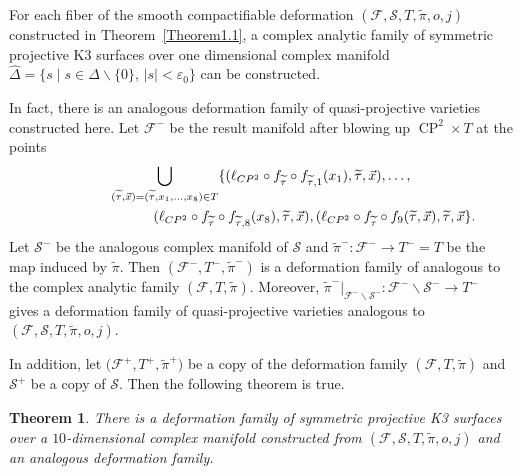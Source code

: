 \documentclass[pdftex]{sigma}
\numberwithin{equation}{section}
\newtheorem{Theorem}{Theorem}[section]
\begin{document}
For each fiber of the smooth compactifiable deformation $(\mathcal{F},\mathcal{S},T,\widetilde{\pi},o,j)$ constructed in Theorem~\ref{Theorem1.1}, a complex analytic family of symmetric projective K3 surfaces over one dimensional complex manifold $\hat{\Delta}=\{ s\mid s \in \Delta \backslash \{ 0 \},\, |s|<\varepsilon_0 \}$ can be constructed.

In fact, there is an analogous deformation family of quasi-projective varieties constructed here. Let $\mathcal{F}^-$ be the result manifold after blowing up $\operatorname{CP}^2\times T$ at the points
\begin{gather*}
\bigcup_{(\widetilde{\tau},\vec{x})=(\widetilde{\tau},x_1,\dots ,x_8)\in T}\{(\ell_{CP^2}\circ f_{\widetilde{\tau}}\circ f_{\widetilde{\tau},1}(x_1),\widetilde{\tau},\vec{x}),\dots ,\\
\hphantom{\bigcup_{(\widetilde{\tau},\vec{x})=(\widetilde{\tau},x_1,\dots ,x_8)\in T}} (\ell_{CP^2}\circ f_{\widetilde{\tau}}\circ f_{\widetilde{\tau},8}(x_8),\widetilde{\tau},\vec{x}),(\ell_{CP^2}\circ f_{\widetilde{\tau}}\circ f_9(\widetilde{\tau},\vec{x}),\widetilde{\tau},\vec{x}\}.
\end{gather*}
Let $\mathcal{S}^-$ be the analogous complex manifold of $\mathcal{S}$ and $\widetilde{\pi}^-\colon\mathcal{F}^- \rightarrow T^-=T$ be the map induced by $\widetilde{\pi}$. Then $(\mathcal{F}^-, T^-, \widetilde{\pi}^-)$ is a deformation family of  analogous to the complex analytic family $(\mathcal{F}, T, \widetilde{\pi})$. Moreover, $\widetilde{\pi}^-|_{\mathcal{F}^-\backslash \mathcal{S}^-}\colon{\mathcal{F}^-\backslash \mathcal{S}^-} \rightarrow T^-$ gives a deformation family of quasi-projective varieties analogous to $(\mathcal{F},\mathcal{S},T,\widetilde{\pi},o,j)$.

In addition, let $\bigl(\mathcal{F}^+, T^+, \widetilde{\pi}^+\bigr)$ be a copy of the deformation family $(\mathcal{F}, T, \widetilde{\pi})$ and $\mathcal{S}^+$ be a copy of $\mathcal{S}$. Then the following theorem is true.

\begin{Theorem} \label{Theorem4.3}
There is a deformation family of symmetric projective K3 surfaces over a $10$-dimensional complex manifold constructed from $(\mathcal{F},\mathcal{S},T,\widetilde{\pi},o,j)$ and an analogous deformation family.
\end{Theorem}
\end{document}
